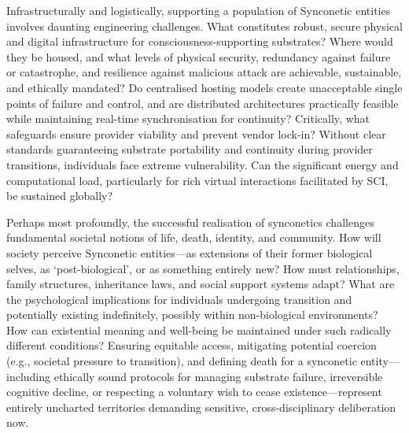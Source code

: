 \documentclass[10pt]{article}
\begin{document}
\begin{sloppypar}
  Infrastructurally and logistically, supporting a population of Synconetic entities involves daunting engineering challenges. What constitutes robust, secure physical and digital infrastructure for consciousness-supporting substrates? Where would they be housed, and what levels of physical security, redundancy against failure or catastrophe, and resilience against malicious attack are achievable, sustainable, and ethically mandated? Do centralised hosting models create unacceptable single points of failure and control, and are distributed architectures practically feasible while maintaining real-time synchronisation for continuity? Critically, what safeguards ensure provider viability and prevent vendor lock-in? Without clear standards guaranteeing substrate portability and continuity during provider transitions, individuals face extreme vulnerability. Can the significant energy and computational load, particularly for rich virtual interactions facilitated by SCI, be sustained globally?

  Perhaps most profoundly, the successful realisation of synconetics challenges fundamental societal notions of life, death, identity, and community. How will society perceive Synconetic entities—as extensions of their former biological selves, as ‘post-biological’, or as something entirely new? How must relationships, family structures, inheritance laws, and social support systems adapt? What are the psychological implications for individuals undergoing transition and potentially existing indefinitely, possibly within non-biological environments? How can existential meaning and well-being be maintained under such radically different conditions? Ensuring equitable access, mitigating potential coercion (e.g., societal pressure to transition), and defining death for a synconetic entity—including ethically sound protocols for managing substrate failure, irreversible cognitive decline, or respecting a voluntary wish to cease existence—represent entirely uncharted territories demanding sensitive, cross-disciplinary deliberation now.


\end{sloppypar}
\end{document}
